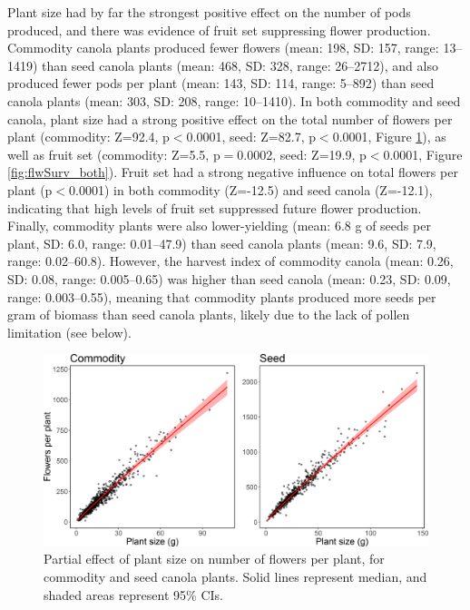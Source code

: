\documentclass[12pt, draft]{article} %
\begin{document}
Plant size had by far the strongest positive effect on the number of pods produced, and there was evidence of fruit set suppressing flower production.
Commodity canola plants produced fewer flowers (mean: 198, SD: 157, range: 13--1419) than seed canola plants (mean: 468, SD: 328, range: 26--2712), and also produced fewer pods per plant (mean: 143, SD: 114, range: 5--892) than seed canola plants (mean: 303, SD: 208, range: 10--1410).
In both commodity and seed canola, plant size had a strong positive effect on the total number of flowers per plant (commodity: Z=92.4, p$<$0.0001, seed: Z=82.7, p$<$0.0001, Figure \ref{fig:plSizeFlwCount}), as well as fruit set (commodity: Z=5.5, p$=$0.0002, seed: Z=19.9, p$<$0.0001, Figure \ref{fig:flwSurv_both}).
Fruit set had a strong negative influence on total flowers per plant (p$<$0.0001) in both commodity (Z=-12.5) and seed canola (Z=-12.1), indicating that high levels of fruit set suppressed future flower production.
Finally, commodity plants were also lower-yielding (mean: 6.8 g of seeds per plant, SD: 6.0, range: 0.01--47.9) than seed canola plants (mean: 9.6, SD: 7.9, range: 0.02--60.8).
However, the harvest index of commodity canola (mean: 0.26, SD: 0.08, range: 0.005--0.65) was higher than seed canola (mean: 0.23, SD: 0.09, range: 0.003--0.55), meaning that commodity plants produced more seeds per gram of biomass than seed canola plants, likely due to the lack of pollen limitation (see below).


\begin{figure} %
    \centering
    \includegraphics[width=\textwidth,keepaspectratio=true]{plSizeflwCount_both.png}
    \caption[Partial effect of plant size on number of flowers per plant]{Partial effect of plant size on number of flowers per plant, for commodity and seed canola plants. Solid lines represent median, and shaded areas represent 95\% CIs.}
    \label{fig:plSizeFlwCount}
\end{figure}
\end{document}
